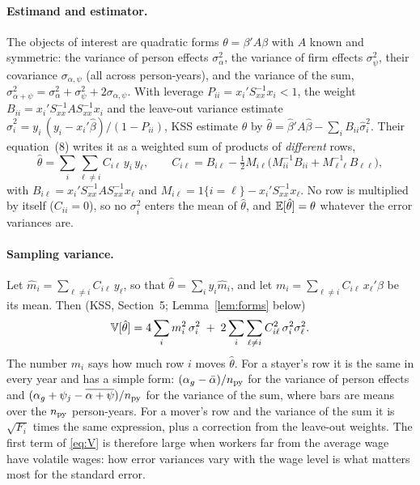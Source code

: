 \paragraph{Estimand and estimator.} The objects of interest are quadratic forms $\theta=\beta'A\beta$ with $A$
known and symmetric: the variance of person effects $\sigma^2_\alpha$, the variance of firm effects
$\sigma^2_\psi$, their covariance $\sigma_{\alpha,\psi}$ (all across person-years), and the variance of the sum,
$\sigma^2_{\alpha+\psi}=\sigma^2_\alpha+\sigma^2_\psi+2\sigma_{\alpha,\psi}$. With leverage
$P_{ii}=x_i'S_{xx}^{-1}x_i<1$, the weight $B_{ii}=x_i'S_{xx}^{-1}AS_{xx}^{-1}x_i$ and the leave-out variance
estimate $\hat\sigma_i^2=y_i\,(y_i-x_i'\hat\beta)/(1-P_{ii})$, KSS estimate $\theta$ by
$\hat\theta=\hat\beta'A\hat\beta-\sum_iB_{ii}\hat\sigma_i^2$. Their equation~(8) writes it as a weighted sum of
products of \emph{different} rows,
\begin{equation}\label{eq:ustat}
\hat\theta=\sum_i\sum_{\ell\ne i}C_{i\ell}\,y_i\,y_\ell,\qquad
C_{i\ell}=B_{i\ell}-\tfrac12M_{i\ell}\big(M_{ii}^{-1}B_{ii}+M_{\ell\ell}^{-1}B_{\ell\ell}\big),
\end{equation}
with $B_{i\ell}=x_i'S_{xx}^{-1}AS_{xx}^{-1}x_\ell$ and $M_{i\ell}=1\{i=\ell\}-x_i'S_{xx}^{-1}x_\ell$. No row is
multiplied by itself ($C_{ii}=0$), so no $\sigma_i^2$ enters the mean of $\hat\theta$, and
$\mathbb{E}[\hat\theta]=\theta$ whatever the error variances are.

\paragraph{Sampling variance.} Let $\hat m_i=\sum_{\ell\ne i}C_{i\ell}\,y_\ell$, so that
$\hat\theta=\sum_iy_i\hat m_i$, and let $m_i=\sum_{\ell\ne i}C_{i\ell}\,x_\ell'\beta$ be its mean. Then (KSS,
Section~5; Lemma~\ref{lem:forms} below)
\begin{equation}\label{eq:V}
\mathbb{V}[\hat\theta]=4\sum_im_i^2\,\sigma_i^2\;+\;2\sum_i\sum_{\ell\ne i}C_{i\ell}^2\,\sigma_i^2\sigma_\ell^2 .
\end{equation}
The number $m_i$ says how much row $i$ moves $\hat\theta$. For a stayer's row it is the same in every year and has
a simple form: $(\alpha_g-\bar\alpha)/n_{\rm py}$ for the variance of person effects and
$(\alpha_g+\psi_j-\overline{\alpha+\psi})/n_{\rm py}$ for the variance of the sum, where bars are means over the
$n_{\rm py}$ person-years. For a mover's row and the variance of the sum it is $\sqrt{F_i}$ times the same expression, plus a
correction from the leave-out weights. The first term of
\eqref{eq:V} is therefore large when workers far from the average wage have volatile wages: how error variances
vary with the wage level is what matters most for the standard error.

